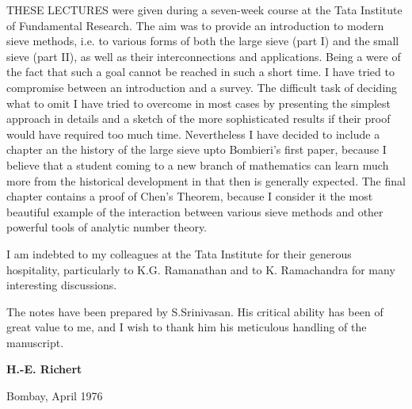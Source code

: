 THESE LECTURES were given during a seven-week course at the Tata
Institute of Fundamental Research. The aim was to provide an
introduction to modern sieve methods, i.e. to various forms of both
the large sieve (part I) and the small sieve (part II), as well as
their interconnections and applications. Being a were of the fact that
such a goal  cannot be reached in such a short time. I have tried to
compromise between an introduction and a survey. The difficult task of
deciding what to omit I have tried to overcome in most cases by
presenting the simplest approach in details and a sketch of the more
sophisticated results if their proof would have required too much
time. Nevertheless I have decided to include a chapter an the history
of the large sieve upto Bombieri's first paper, because I believe that
a student coming to a new branch of mathematics can learn much more
from the historical development in that then is generally
expected. The final chapter contains a proof of Chen's Theorem,
because I consider it the most beautiful example of the interaction
between various sieve methods and other powerful tools of analytic
number theory. 

I am indebted to my colleagues at the Tata Institute for their
generous  hospitality, particularly to K.G. Ramanathan and to
K. Ramachandra for many interesting discussions. 

The notes have been prepared by S.Srinivasan. His critical ability has
been of great value to me, and I wish to thank him his meticulous
handling of the manuscript. 
\bigskip

\hfill{\large\bf H.-E. Richert}

\noindent
\hfill Bombay, 
April 1976

